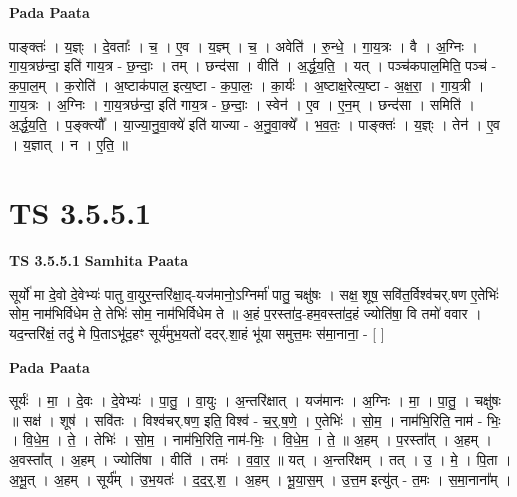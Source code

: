 \documentclass[17pt]{extarticle}
\begin{document}
\textbf{Pada Paata} \newline

पाङ्क्तः॑ । य॒ज्ञ्ः । दे॒वताः᳚ । च॒ । ए॒व । य॒ज्ञ्म् । च॒ । अवेति॑ । रु॒न्धे॒ । गा॒य॒त्रः । वै । अ॒ग्निः । गा॒य॒त्रछ॑न्दा॒ इति॑ गाय॒त्र - छ॒न्दाः॒ । तम् । छन्द॑सा । वीति॑ । अ॒र्द्ध॒य॒ति॒ । यत् । पञ्च॑कपाल॒मिति॒ पञ्च॑ - क॒पा॒ल॒म् । क॒रोति॑ । अ॒ष्टाक॑पाल॒ इत्य॒ष्टा - क॒पा॒लः॒ । का॒र्यः॑ । अ॒ष्टाक्ष॒रेत्य॒ष्टा - अ॒क्ष॒रा॒ । गा॒य॒त्री । गा॒य॒त्रः । अ॒ग्निः । गा॒य॒त्रछ॑न्दा॒ इति॑ गाय॒त्र - छ॒न्दाः॒ । स्वेन॑ । ए॒व । ए॒न॒म् । छन्द॑सा । समिति॑ । अ॒र्द्ध॒य॒ति॒ । प॒ङ्क्त्यौ᳚ । या॒ज्या॒नु॒वा॒क्ये॑ इति॑ याज्या - अ॒नु॒वा॒क्ये᳚ । भ॒व॒तः॒ । पाङ्क्तः॑ । य॒ज्ञ्ः । तेन॑ । ए॒व । य॒ज्ञात् । न । ए॒ति॒ ॥  \newline




\section*{ TS 3.5.5.1 }

\textbf{TS 3.5.5.1 } \newline
\textbf{Samhita Paata} \newline

सूर्यो॑ मा दे॒वो दे॒वेभ्यः॑ पातु वा॒युर॒न्तरि॑क्षा॒द्-यज॑मानो॒ऽग्निर्मा॑ पातु॒ चक्षु॑षः । सक्ष॒ शूष॒ सवि॑त॒र्विश्व॑चर्.षण ए॒तेभिः॑ सोम॒ नाम॑भिर्विधेम ते॒ तेभिः॑ सोम॒ नाम॑भिर्विधेम ते ॥ अ॒हं प॒रस्ता॑द॒-हम॒वस्ता॑द॒हं ज्योति॑षा॒ वि तमो॑ ववार । यद॒न्तरि॑क्षं॒ तदु॑ मे पि॒ताऽभू॑द॒हꣳ सूर्य॑मुभ॒यतो॑ ददर्.शा॒हं भू॑या समुत्त॒मः स॑मा॒नाना॒ - [  ] \newline

\textbf{Pada Paata} \newline

सूर्यः॑ । मा॒ । दे॒वः । दे॒वेभ्यः॑ । पा॒तु॒ । वा॒युः । अ॒न्तरि॑क्षात् । यज॑मानः । अ॒ग्निः । मा॒ । पा॒तु॒ । चक्षु॑षः ॥ सक्ष॑ । शूष॑ । सवि॑तः । विश्व॑चर्.षण॒ इति॒ विश्व॑ - च॒र्॒.ष॒णे॒ । ए॒तेभिः॑ । सो॒म॒ । नाम॑भि॒रिति॒ नाम॑ - भिः॒ । वि॒धे॒म॒ । ते॒ । तेभिः॑ । सो॒म॒ । नाम॑भि॒रिति॒ नाम॑-भिः॒ । वि॒धे॒म॒ । ते॒ ॥ अ॒हम् । प॒रस्ता᳚त् । अ॒हम् । अ॒वस्ता᳚त् । अ॒हम् । ज्योति॑षा । वीति॑ । तमः॑ । व॒वा॒र॒ ॥ यत् । अ॒न्तरि॑क्षम् । तत् । उ॒ । मे॒ । पि॒ता । अ॒भू॒त् । अ॒हम् । सूर्य᳚म् । उ॒भ॒यतः॑ । द॒द॒र्॒.श॒ । अ॒हम् । भू॒या॒स॒म् । उ॒त्त॒म इत्यु॑त् - त॒मः । स॒मा॒नाना᳚म् ।  \newline




\end{document}
